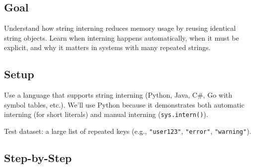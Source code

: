 \documentclass[
  letterpaper,
  DIV=11,
  numbers=noendperiod]{scrreprt}
\begin{document}
\subsection{Goal}\label{goal-1}

Understand how string interning reduces memory usage by reusing
identical string objects. Learn when interning happens automatically,
when it must be explicit, and why it matters in systems with many
repeated strings.

\subsection{Setup}\label{setup-1}

Use a language that supports string interning (Python, Java, C\#, Go
with symbol tables, etc.). We'll use Python because it demonstrates both
automatic interning (for short literals) and manual interning
(\texttt{sys.intern()}).

Test dataset: a large list of repeated keys (e.g., \texttt{"user123"},
\texttt{"error"}, \texttt{"warning"}).

\subsection{Step-by-Step}\label{step-by-step-1}
\end{document}
